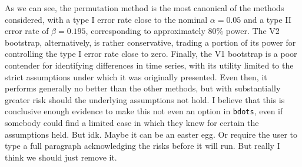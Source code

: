 \documentclass{article}
\newcommand{\xt}{\texttt}
\begin{document}
As we can see, the permutation method is the most canonical of the methods considered, with a type I error rate close to the nominal $\alpha = 0.05$ and a type II error rate of $\beta = 0.195$, corresponding to approximately 80\% power. The V2 bootstrap, alternatively, is rather conservative, trading a portion of its power for controlling the type I error rate close to zero. Finally, the V1 bootstrap is a poor contender for identifying differences in time series, with its utility limited to the strict assumptions under which it was originally presented. Even then, it performs generally no better than the other methods, but with substantially greater risk should the underlying assumptions not hold. I believe that this is conclusive enough evidence to make this not even an option in \xt{bdots}, even if somebody could find a limited case in which they knew for certain the assumptions held. But idk. Maybe it can be an easter egg. Or require the user to type a full paragraph acknowledging the risks before it will run. But really I think we should just remove it.



\end{document}
